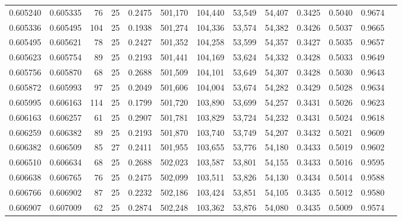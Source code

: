 \begin{tabular}{rrrrrrrrrrrrr}
0.605240 & 0.605335 &    76 &  25 &                                     0.2475 & 501,170 & 104,440 &  53,549 &  54,407 & 0.3425 & 0.5040 & 0.9674 \\
0.605336 & 0.605495 &   104 &  25 &                                     0.1938 & 501,274 & 104,336 &  53,574 &  54,382 & 0.3426 & 0.5037 & 0.9665 \\
0.605495 & 0.605621 &    78 &  25 &                                     0.2427 & 501,352 & 104,258 &  53,599 &  54,357 & 0.3427 & 0.5035 & 0.9657 \\
0.605623 & 0.605754 &    89 &  25 &                                     0.2193 & 501,441 & 104,169 &  53,624 &  54,332 & 0.3428 & 0.5033 & 0.9649 \\
0.605756 & 0.605870 &    68 &  25 &                                     0.2688 & 501,509 & 104,101 &  53,649 &  54,307 & 0.3428 & 0.5030 & 0.9643 \\
0.605872 & 0.605993 &    97 &  25 &                                     0.2049 & 501,606 & 104,004 &  53,674 &  54,282 & 0.3429 & 0.5028 & 0.9634 \\
0.605995 & 0.606163 &   114 &  25 &                                     0.1799 & 501,720 & 103,890 &  53,699 &  54,257 & 0.3431 & 0.5026 & 0.9623 \\
0.606163 & 0.606257 &    61 &  25 &                                     0.2907 & 501,781 & 103,829 &  53,724 &  54,232 & 0.3431 & 0.5024 & 0.9618 \\
0.606259 & 0.606382 &    89 &  25 &                                     0.2193 & 501,870 & 103,740 &  53,749 &  54,207 & 0.3432 & 0.5021 & 0.9609 \\
0.606382 & 0.606509 &    85 &  27 &                                     0.2411 & 501,955 & 103,655 &  53,776 &  54,180 & 0.3433 & 0.5019 & 0.9602 \\
0.606510 & 0.606634 &    68 &  25 &                                     0.2688 & 502,023 & 103,587 &  53,801 &  54,155 & 0.3433 & 0.5016 & 0.9595 \\
0.606638 & 0.606765 &    76 &  25 &                                     0.2475 & 502,099 & 103,511 &  53,826 &  54,130 & 0.3434 & 0.5014 & 0.9588 \\
0.606766 & 0.606902 &    87 &  25 &                                     0.2232 & 502,186 & 103,424 &  53,851 &  54,105 & 0.3435 & 0.5012 & 0.9580 \\
0.606907 & 0.607009 &    62 &  25 &                                     0.2874 & 502,248 & 103,362 &  53,876 &  54,080 & 0.3435 & 0.5009 & 0.9574 \\

\end{tabular}
